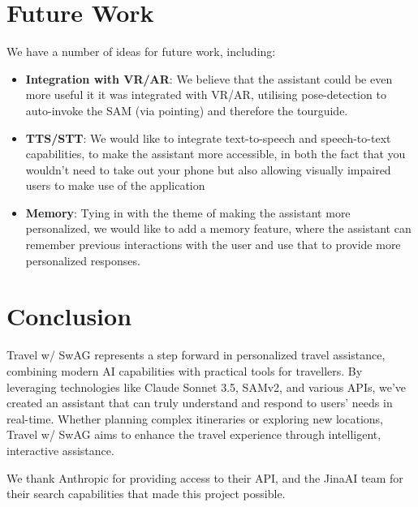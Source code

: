 \documentclass{article}
\begin{document}
\section{Future Work}

We have a number of ideas for future work, including:

\begin{itemize}
\item \textbf{Integration with VR/AR}: We believe that the assistant could be even more useful it it was integrated with VR/AR, utilising pose-detection to auto-invoke the SAM (via pointing) and therefore the tourguide.
\item \textbf{TTS/STT}: We would like to integrate text-to-speech and speech-to-text capabilities, to make the assistant more accessible, in both the fact that you wouldn't need to take out your phone but also allowing visually impaired users to make use of the application
\item \textbf{Memory}: Tying in with the theme of making the assistant more personalized, we would like to add a memory feature, where the assistant can remember previous interactions with the user and use that to provide more personalized responses.
\end{itemize}

\section{Conclusion}

Travel w/ SwAG represents a step forward in personalized travel assistance, combining modern AI capabilities with practical tools for travellers. By leveraging technologies like Claude Sonnet 3.5, SAMv2, and various APIs, we've created an assistant that can truly understand and respond to users' needs in real-time. Whether planning complex itineraries or exploring new locations, Travel w/ SwAG aims to enhance the travel experience through intelligent, interactive assistance.

We thank Anthropic for providing access to their API, and the JinaAI team for their search capabilities that made this project possible.
\end{document}
